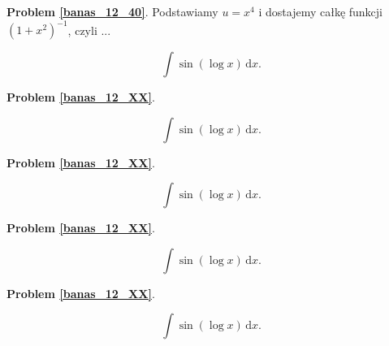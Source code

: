 \textbf{Problem \ref{banas_12_40}}.
Podstawiamy $u = x^4$ i dostajemy całkę funkcji $(1+x^2)^{-1}$, czyli ...

\begin{problem_with_solution}
    \label{banas_12_XX}%
    \begin{equation}
        \int \sin(\log x) \, \mathrm{d}x.
    \end{equation}
\end{problem_with_solution}

\textbf{Problem \ref{banas_12_XX}}.

\begin{problem_with_solution}
    \label{banas_12_XX}%
    \begin{equation}
        \int \sin(\log x) \, \mathrm{d}x.
    \end{equation}
\end{problem_with_solution}

\textbf{Problem \ref{banas_12_XX}}.

\begin{problem_with_solution}
    \label{banas_12_XX}%
    \begin{equation}
        \int \sin(\log x) \, \mathrm{d}x.
    \end{equation}
\end{problem_with_solution}

\textbf{Problem \ref{banas_12_XX}}.

\begin{problem_with_solution}
    \label{banas_12_XX}%
    \begin{equation}
        \int \sin(\log x) \, \mathrm{d}x.
    \end{equation}
\end{problem_with_solution}

\textbf{Problem \ref{banas_12_XX}}.

\begin{problem_with_solution}
    \label{banas_12_XX}%
    \begin{equation}
        \int \sin(\log x) \, \mathrm{d}x.
    \end{equation}
\end{problem_with_solution}

